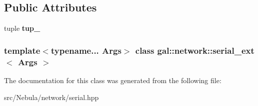 \subsection*{\-Public \-Attributes}
\begin{DoxyCompactItemize}
\item 
\hypertarget{classgal_1_1network_1_1serial__ext_ac091f912da995c0f8dad27fc225f2fba}{tuple {\bfseries tup\-\_\-}}\label{classgal_1_1network_1_1serial__ext_ac091f912da995c0f8dad27fc225f2fba}

\end{DoxyCompactItemize}
\subsubsection*{template$<$typename... \-Args$>$ class gal\-::network\-::serial\-\_\-ext$<$ Args $>$}



\-The documentation for this class was generated from the following file\-:\begin{DoxyCompactItemize}
\item 
src/\-Nebula/network/serial.\-hpp\end{DoxyCompactItemize}
